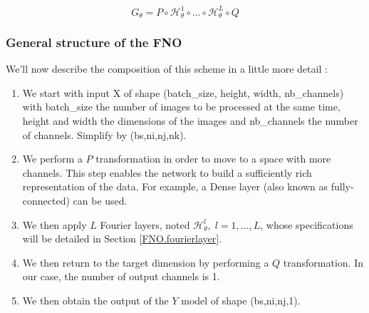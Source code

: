 
\begin{equation*}
	G_\theta = P \circ \mathcal{H}_\theta^1 \circ \dots \circ \mathcal{H}_\theta^L \circ Q
\end{equation*}

\subsubsection{General structure of the FNO} \label{FNO.general}


We'll now describe the composition of this scheme in a little more detail :
\begin{enumerate}[label=\textbullet]
	\item We start with input X of shape (batch\_size, height, width, nb\_channels) with batch\_size the number of images to be processed at the same time, height and width the dimensions of the images and nb\_channels the number of channels. Simplify by (bs,ni,nj,nk).
	\item We perform a $P$ transformation in order to move to a space with more channels. This step enables the network to build a sufficiently rich representation of the data.  For example, a Dense layer (also known as fully-connected) can be used. 	
	\item We then apply $L$ Fourier layers, noted $\mathcal{H}_\theta^l,\; l=1,\dots,L$, whose specifications will be detailed in Section \ref{FNO.fourierlayer}.
	\item We then return to the target dimension by performing a $Q$ transformation. In our case, the number of output channels is 1.
	\item We then obtain the output of the $Y$ model of shape (bs,ni,nj,1). 
\end{enumerate}

